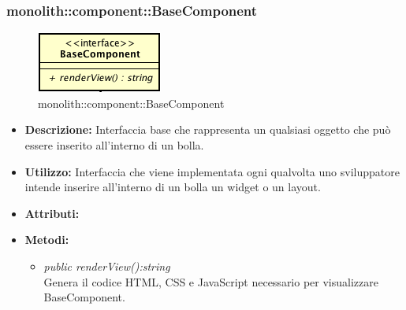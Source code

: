 \subsubsection{monolith::component::BaseComponent}

\label{monolith::component::BaseComponent}
\begin{figure}[ht]
	\centering
	\includegraphics[scale=0.5]{Sezioni/SottosezioniST/img/BaseComponent.png}
	\caption{monolith::component::BaseComponent}
\end{figure}

\begin{itemize}
\item \textbf{Descrizione:} Interfaccia base che rappresenta un qualsiasi oggetto che può essere inserito all'interno di un bolla.
\item \textbf{Utilizzo:} Interfaccia che viene implementata ogni qualvolta uno sviluppatore intende inserire all'interno di un bolla un widget o un layout.
\item \textbf{Attributi:}
\item \textbf{Metodi:}
\begin{itemize}
\item \textit{public renderView():string}\\
Genera il codice HTML, CSS e JavaScript necessario per visualizzare BaseComponent.
\end{itemize}
\end{itemize}